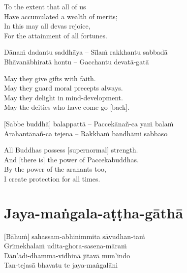 \begin{english-verses}
  To the extent that all of us\\
  Have accumulated a wealth of merits;\\
  In this may all devas rejoice,\\
  For the attainment of all fortunes.
\end{english-verses}

Dānaṁ dadantu saddhāya – Sīlaṁ rakkhantu sabbadā\\
Bhāvanābhiratā hontu – Gacchantu devatā-gatā

\begin{english-verses}
  May they give gifts with faith.\\
  May they guard moral precepts always.\\
  May they delight in mind-development.\\
  May the deities who have come go [back].
\end{english-verses}

[Sabbe buddhā] balappattā – Paccekānañ-ca yaṁ balaṁ\\
Arahantānañ-ca tejena – Rakkhaṁ bandhāmi sabbaso

\begin{english-verses}
  All Buddhas possess [supernormal] strength.\\
  And [there is] the power of Paccekabuddhas.\\
  By the power of the arahants too,\\
  I create protection for all times.
\end{english-verses}

\suttaRef{[MJG]}

\section{Jaya-maṅgala-aṭṭha-gāthā}
\label{jaya-mangala-attha-gatha}

\vspace{-1em}

[Bāhuṁ] sahassam-abhinimmita sāvudhan-taṁ\\
Grīmekhalaṁ udita-ghora-sasena-māraṁ\\
Dān'ādi-dhamma-vidhinā jitavā\hyperlink{endnote126-appendix}{\hypertarget{endnote126-body}{}}
mun'indo\\
Tan-tejasā bhavatu te jaya-maṅgalāni

